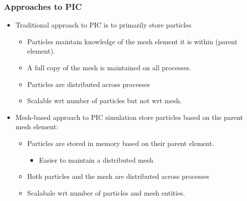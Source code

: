 \documentclass[aspectratio=169]{beamer}
\begin{document}
\begin{frame}
  \frametitle{Approaches to PIC}
  \begin{itemize}
  \item Traditional approach to PIC is to primarily store particles
    \begin{itemize}
    \item Particles maintain knowledge of the mesh element it is within (parent element).
    \item A full copy of the mesh is maintained on all processes.
    \item Particles are distributed across processes
    \item Scalable wrt number of particles but not wrt mesh.
    \end{itemize}

  \item Mesh-based approach to PIC simulation store particles based on the parent mesh element:
    \begin{itemize}
    \item Particles are stored in memory based on their parent element.
      \begin{itemize}
      \item Easier to maintain a distributed mesh
      \end{itemize}
    \item Both particles and the mesh are distributed across processes
    \item Scalabale wrt number of particles and mesh entities.
    \end{itemize}
  \end{itemize}
\end{frame}
\end{document}

